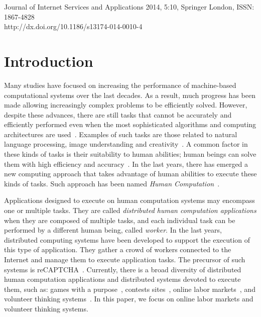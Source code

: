 \documentclass[11pt]{bmc_article_s50}
\begin{document}
Journal of Internet Services and Applications 2014, 5:10, Springer London, ISSN: 1867-4828 \\ http://dx.doi.org/10.1186/s13174-014-0010-4 

\section{Introduction}

Many studies have focused on increasing the performance of machine-based computational systems over the last decades. As a result, much progress has been made allowing increasingly complex problems to be efficiently solved. However, despite these advances, there are still tasks that cannot be accurately and efficiently performed even when the most sophisticated algorithms and computing architectures are used~\cite{Quinn2011,Savage2012}. Examples of such tasks are those related to natural language processing, image understanding and creativity~\cite{Yuen:2009,King2011}. A common factor in these kinds of tasks is their suitability to human abilities; human beings can solve them with high efficiency and accuracy~\cite{Quinn2011,Savage2012}. In the last years, there has emerged a new computing approach that takes advantage of human abilities to execute these kinds of tasks. Such approach has been named \textit{Human Computation}~\cite{Quinn2009,Quinn2011}.

Applications designed to execute on human computation systems may encompass one or multiple tasks. They are called \textit{distributed human computation applications} when they are composed of multiple tasks, and each individual task can be performed by a different human being, called \textit{worker}. In the last years, distributed computing systems have been developed to support the execution of this type of application. They gather a crowd of workers connected to the Internet and manage them to execute application tasks. The precursor of such systems is reCAPTCHA~\cite{von:Science:2008}. Currently, there is a broad diversity of distributed human computation applications and distributed systems devoted to execute them, such as: games with a purpose~\cite{vonAhn:2008}, contests sites~\cite{Archak:2010}, online labor markets~\cite{Ipeirotis:2010}, and volunteer thinking systems~\cite{Ponciano:CiSE:2014}. In this paper, we focus on online labor markets and volunteer thinking systems.
\end{document}
